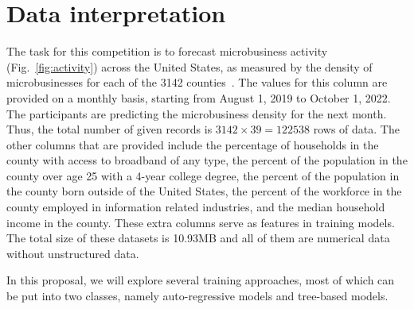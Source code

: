 \documentclass[prl,aps,superscriptaddress,twocolumn,10pt,nolongbibliography]{revtex4-2}
\begin{document}
\section{Data interpretation}
The task for this competition is to forecast microbusiness activity (Fig.~\ref{fig:activity}) across the United States, as measured by the density of microbusinesses for each of the 3142 counties~\cite{yu2021godaddy}.
The values for this column are provided on a monthly basis, starting from August 1, 2019 to October 1, 2022. 
The participants are predicting the microbusiness density for the next month. 
Thus, the total number of given records is $3142 \times 39 = 122538$ rows of data.
The other columns that are provided include the percentage of households in the county with access to broadband of any type, the percent of the population in the county over age 25 with a 4-year college degree, the percent of the population in the county born outside of the United States, the percent of the workforce in the county employed in information related industries, and the median household income in the county. 
These extra columns serve as features in training models.
The total size of these datasets is 10.93MB and all of them are numerical data without unstructured data. 

In this proposal, we will explore several training approaches, most of which can be put into two classes, namely auto-regressive models and tree-based models. 

\end{document}
